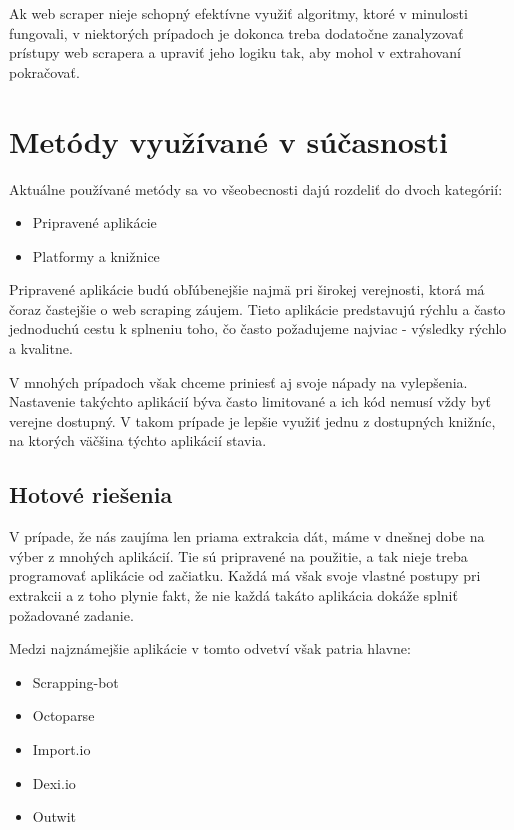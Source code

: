 Ak web scraper nieje schopný efektívne využiť algoritmy, ktoré v minulosti fungovali, v niektorých prípadoch je dokonca treba dodatočne zanalyzovať prístupy web scrapera a upraviť jeho logiku tak, aby mohol v extrahovaní pokračovať.

\section{Metódy využívané v súčasnosti}

Aktuálne používané metódy sa vo všeobecnosti dajú rozdeliť do dvoch kategórií:
\begin{itemize}
    \item {Pripravené aplikácie}
    \item {Platformy a knižnice}
\end{itemize}

\bigskip

Pripravené aplikácie budú obľúbenejšie najmä pri širokej verejnosti, ktorá má čoraz častejšie o web scraping záujem. Tieto aplikácie predstavujú rýchlu a často jednoduchú cestu k splneniu toho, čo často požadujeme najviac - výsledky rýchlo a kvalitne.

V mnohých prípadoch však chceme priniesť aj svoje nápady na vylepšenia. Nastavenie takýchto aplikácií býva často limitované a ich kód nemusí vždy byť verejne dostupný. V takom prípade je lepšie využiť jednu z dostupných knižníc, na ktorých väčšina týchto aplikácií stavia. 

\subsection{Hotové riešenia}
V prípade, že nás zaujíma len priama extrakcia dát, máme v dnešnej dobe na výber z mnohých aplikácií. Tie sú pripravené na použitie, a tak nieje treba programovať aplikácie od začiatku. Každá má však svoje vlastné postupy pri extrakcii a z toho plynie fakt, že nie každá takáto aplikácia dokáže splniť požadované zadanie. 

\newpage
Medzi najznámejšie aplikácie v tomto odvetví však patria hlavne\cite{WebScrap}:

\begin{itemize}
    \item {Scrapping-bot}
    \item {Octoparse}
    \item {Import.io}
    \item {Dexi.io}
    \item {Outwit}
\end{itemize}

